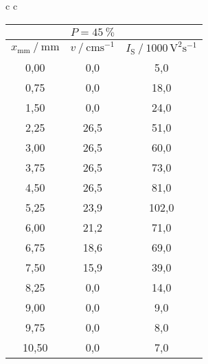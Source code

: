 \begin{table}[H]
\begin{tabular}{c c}
      \begin{tabular}{c c c} 
          \hline
          \toprule
          & $P = \qty{45}{\percent}$ & \\
          \midrule
          $x_\text{mm} \mathbin{/} \unit{\milli\meter}$ &
          $v \mathbin{/} \mathrm{cm s^{-1}}$ &
          $I_\text{S} \mathbin{/} \mathrm{1000 \, V^2 s^{-1}}$ \\
          \midrule
          0,00 &  0,0 &   5,0 \\
          0,75 &  0,0 &  18,0 \\
          1,50 &  0,0 &  24,0 \\
          2,25 & 26,5 &  51,0 \\
          3,00 & 26,5 &  60,0 \\
          3,75 & 26,5 &  73,0 \\
          4,50 & 26,5 &  81,0 \\
          5,25 & 23,9 & 102,0 \\
          6,00 & 21,2 &  71,0 \\
          6,75 & 18,6 &  69,0 \\
          7,50 & 15,9 &  39,0 \\
          8,25 &  0,0 &  14,0 \\
          9,00 &  0,0 &   9,0 \\
          9,75 &  0,0 &   8,0 \\
         10,50 &  0,0 &   7,0 \\
          \bottomrule
          \hline
      \end{tabular} \\
  \end{tabular}

\end{table}

